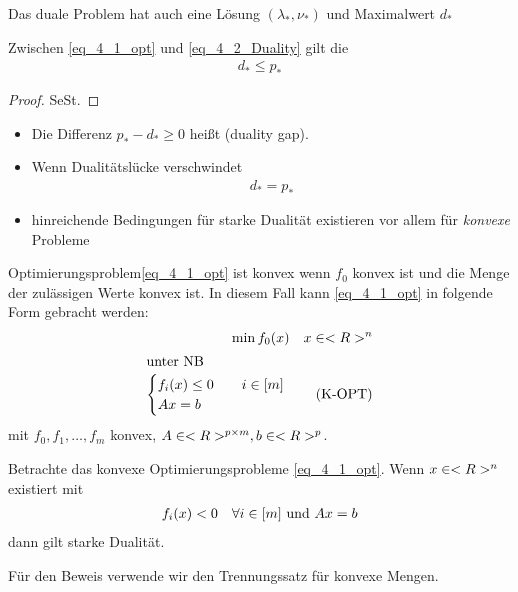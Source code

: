 Das duale Problem hat auch eine Lösung $(\lambda_{\ast}, \nu_{\ast})$ und Maximalwert $d_{\ast}$
\begin{lemma}
	Zwischen \eqref{eq_4_1_opt} und \eqref{eq_4_2_Duality} gilt die 
	\begin{align*}
		d_{\ast} \le p_{\ast}\tag{WD}\label{eq_4_3_weak_Duality}
	\end{align*}
\end{lemma}
\begin{proof}
	SeSt.
\end{proof}
\begin{*remark}
	\begin{itemize}
		\item Die Differenz $p_{\ast} - d_{\ast} \ge 0$ heißt  (duality gap).
		\item Wenn Dualitätslücke verschwindet 
		\begin{align*}
			d_{\ast} = p_{\ast}
		\end{align*}
		\item hinreichende Bedingungen für starke Dualität existieren vor allem für \emph{konvexe} Probleme
	\end{itemize}
\end{*remark}
\begin{definition}
	Optimierungsproblem\eqref{eq_4_1_opt} ist konvex wenn $f_0$ konvex ist und die Menge der zulässigen Werte konvex ist. In diesem Fall kann \eqref{eq_4_1_opt} in folgende Form gebracht werden:
	\begin{align*}
		\min f_0(x) \quad x \in <R>^n\\
		\intertext{unter NB}
		\begin{cases}
			f_i(x) \le 0 &\quad i \in [m]\\
			Ax = b &\quad
		\end{cases}\tag{K-OPT}\label{eq_4_4_kopt}
	\end{align*}
	mit $f_0, f_1, \dots, f_m$ konvex, $A \in <R>^{p\times m}, b \in <R>^p$.
\end{definition}
\begin{theorem}
	Betrachte das konvexe Optimierungsprobleme \eqref{eq_4_1_opt}. Wenn $x \in <R>^n$ existiert mit
	\begin{align*}
		f_i(x) < 0 \quad \forall i \in [m] \text{ und } Ax = b
	\end{align*}
	dann gilt starke Dualität.
\end{theorem}
Für den Beweis verwende wir den Trennungssatz für konvexe Mengen.
